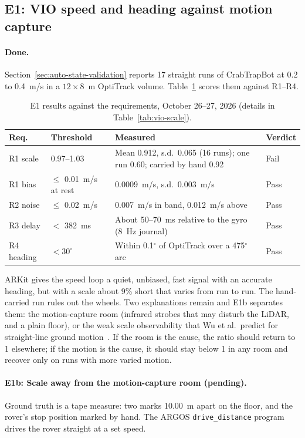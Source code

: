 \subsection{E1: VIO speed and heading against motion capture}
\label{sec:phone-e1}

\paragraph{Done.}
Section~\ref{sec:auto-state-validation} reports 17 straight runs of CrabTrapBot at 0.2 to 0.4~m/s in a $12 \times 8$~m OptiTrack volume.
Table~\ref{tab:phone-e1} scores them against R1--R4.

\begin{table}[ht]
\centering
\caption{E1 results against the requirements, October 26--27, 2026 (details in Table~\ref{tab:vio-scale}).}
\label{tab:phone-e1}
\small
\begin{tabularx}{\textwidth}{@{}l X X l@{}}
\toprule
Req. & Threshold & Measured & Verdict \\
\midrule
R1 scale & 0.97--1.03 & Mean 0.912, s.d.\ 0.065 (16 runs); one run 0.60; carried by hand 0.92 & Fail \\
R1 bias & $\le$ 0.01~m/s at rest & 0.0009~m/s, s.d.\ 0.003~m/s & Pass \\
R2 noise & $\le$ 0.02~m/s & 0.007~m/s in band, 0.012~m/s above & Pass \\
R3 delay & $<$ 382~ms & About 50--70~ms relative to the gyro (8~Hz journal) & Pass \\
R4 heading & $< 30^\circ$ & Within 0.1$^\circ$ of OptiTrack over a 475$^\circ$ arc & Pass \\
\bottomrule
\end{tabularx}
\end{table}

ARKit gives the speed loop a quiet, unbiased, fast signal with an accurate heading, but with a scale about 9\% short that varies from run to run.
The hand-carried run rules out the wheels.
Two explanations remain and E1b separates them: the motion-capture room (infrared strobes that may disturb the LiDAR, and a plain floor), or the weak scale observability that Wu et al.\ predict for straight-line ground motion~\citep{wu2017vinswheels}.
If the room is the cause, the ratio should return to 1 elsewhere; if the motion is the cause, it should stay below 1 in any room and recover only on runs with more varied motion.

\paragraph{E1b: Scale away from the motion-capture room (pending).}
Ground truth is a tape measure: two marks 10.00~m apart on the floor, and the rover's stop position marked by hand.
The ARGOS \texttt{drive\_distance} program drives the rover straight at a set speed.

